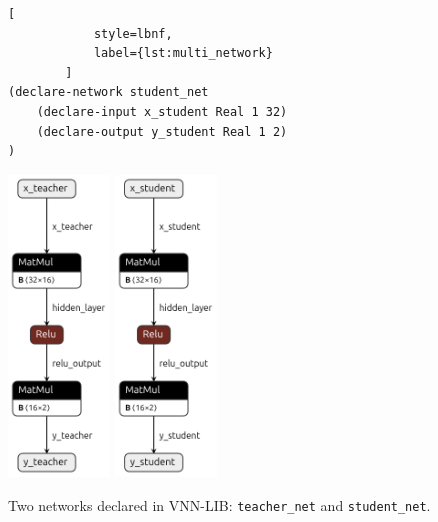 \begin{figure}[htbp]
\begin{minipage}[c]{0.55\textwidth}
\begin{lstlisting}[
            style=lbnf,
            label={lst:multi_network}
        ]
(declare-network student_net
    (declare-input x_student Real 1 32)
    (declare-output y_student Real 1 2)
)
        \end{lstlisting}
    \end{minipage}
    \begin{minipage}[c]{0.45\textwidth}
        \centering
        \includegraphics[height=8cm]{imgs/teacher_net.onnx.png}
        \vspace{0.5cm} 
        \includegraphics[height=8cm]{imgs/student_net.onnx.png}
    \end{minipage}
    \caption{Two networks declared in VNN-LIB: \texttt{teacher\_net} and \texttt{student\_net}.}
    \label{fig:multi_network}
\end{figure}

